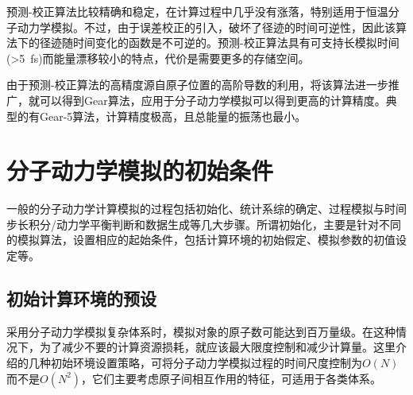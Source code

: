 预测-校正算法比较精确和稳定，在计算过程中几乎没有涨落，特别适用于恒温分子动力学模拟。不过，由于误差校正的引入，破坏了径迹的时间可逆性，因此该算法下的径迹随时间变化的函数是不可逆的。预测-校正算法具有可支持长模拟时间(>5~\textrm{fs})而能量漂移较小的特点，代价是需要更多的存储空间。

由于预测-校正算法的高精度源自原子位置的高阶导数的利用，将该算法进一步推广，就可以得到\textrm{Gear}算法\cite{ODE_1971}，应用于分子动力学模拟可以得到更高的计算精度。典型的有\textrm{Gear}-5算法，计算精度极高，且总能量的振荡也最小。%

\section{分子动力学模拟的初始条件}
一般的分子动力学计算模拟的过程包括初始化、统计系综的确定、过程模拟与时间步长积分/动力学平衡判断和数据生成等几大步骤。所谓初始化，主要是针对不同的模拟算法，设置相应的起始条件，包括计算环境的初始假定、模拟参数的初值设定等。%
\subsection{初始计算环境的预设}
采用分子动力学模拟复杂体系时，模拟对象的原子数可能达到百万量级。在这种情况下，为了减少不要的计算资源损耗，就应该最大限度控制和减少计算量。这里介绍的几种初始环境设置策略，可将分子动力学模拟过程的时间尺度控制为$O(N)$而不是$O(N^2)$，它们主要考虑原子间相互作用的特征，可适用于各类体系。

